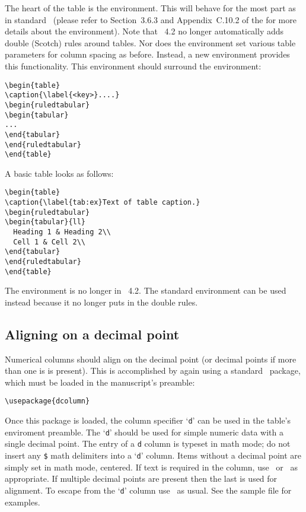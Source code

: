 \documentclass[%
,aps%
 ,twocolumn%
 ,secnumarabic%
,amssymb, amsmath,nobibnotes, aps, prl, floatfix]{revtex4-2}
\begin{document}
The heart of the table is the
 environment. This will behave for the most part as in
standard \LaTeXe\ (please refer to Section~3.6.3 and Appendix~C.10.2 of the
\LUG{} for more details about the  environment).
Note that \revtex~4.2 no longer automatically adds double (Scotch) rules
around tables. Nor does the  environment set various
table parameters for column spacing as before. Instead, a new
environment  provides this functionality. This
environment should surround the  environment:
\begin{verbatim}
\begin{table}
\caption{\label{<key>}....}
\begin{ruledtabular}
\begin{tabular}
...
\end{tabular}
\end{ruledtabular}
\end{table}
\end{verbatim}

A basic table looks as follows:
\begin{verbatim}
\begin{table}
\caption{\label{tab:ex}Text of table caption.}
\begin{ruledtabular}
\begin{tabular}{ll}
  Heading 1 & Heading 2\\
  Cell 1 & Cell 2\\
\end{tabular}
\end{ruledtabular}
\end{table}
\end{verbatim}

The  environment is no longer in \revtex~4.2. The
standard  environment can be used instead because it
no longer puts in the double rules.

\subsection{Aligning on a decimal point}
Numerical columns should align on the decimal point (or
decimal points if more than one is is present). This is accomplished
by again using a standard \LaTeXe\ package,  which
must be loaded in the manuscript's preamble:
\begin{verbatim}
\usepackage{dcolumn}
\end{verbatim}
Once this package is loaded, the column specifier `\texttt{d}' can be
used in the table's  enviroment preamble.
The `\texttt{d}' should be used for simple numeric data with a single
decimal point.
%
The entry of a \texttt{d} column is typeset in math mode; do not
insert any \verb+$+ math delimiters into a `\texttt{d}' column.  Items
without a decimal point are simply set in math mode, centered.  If
text is required in the column, use \cmd\text\ or \cmd\mbox\ as
appropriate.  If multiple decimal points are present then the last is
used for alignment. To escape from the `\texttt{d}' column use
\cmd\multicolumn\ as usual. See the sample file  for examples.
\end{document}
